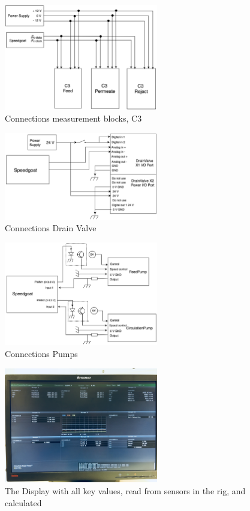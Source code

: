 \begin{figure}[h]
    \centering
    \includegraphics[width=0.6\textwidth]{C3Conn}
    \caption{Connections measurement blocks, C3}
    \label{fig:C3Conn}
\end{figure}
\begin{figure}[h]
    \centering
    \includegraphics[width=0.6\textwidth]{ValveConn}
    \caption{Connections Drain Valve}
    \label{fig:ValveConn}
\end{figure}
\begin{figure}[H]
    \centering
    \includegraphics[width=0.6\textwidth]{PumpConn}
    \caption{Connections Pumps}
    \label{fig:PumpConn}
\end{figure}
\begin{figure}[H]
    \centering
    \includegraphics[width=0.6\textwidth]{Display}
    \caption{The Display with all key values, read from sensors in the rig, and calculated}
    \label{fig:display}
\end{figure}
